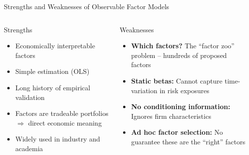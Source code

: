 \documentclass[aspectratio=169]{beamer}
\begin{document}
\begin{frame}{Strengths and Weaknesses of Observable Factor Models}

\begin{columns}[T]
\begin{exampleblock}{Strengths}
\begin{itemize}
    \item Economically interpretable factors
    \item Simple estimation (OLS)
    \item Long history of empirical validation
    \item Factors are tradeable portfolios $\Rightarrow$ direct economic meaning
    \item Widely used in industry and academia
\end{itemize}
\end{exampleblock}

\begin{alertblock}{Weaknesses}
\begin{itemize}
    \item \textbf{Which factors?} The ``factor zoo'' problem -- hundreds of proposed factors
    \item \textbf{Static betas:} Cannot capture time-variation in risk exposures
    \item \textbf{No conditioning information:} Ignores firm characteristics
    \item \textbf{Ad hoc factor selection:} No guarantee these are the ``right'' factors
\end{itemize}
\end{alertblock}
\end{columns}
\end{frame}
%
\end{document}
